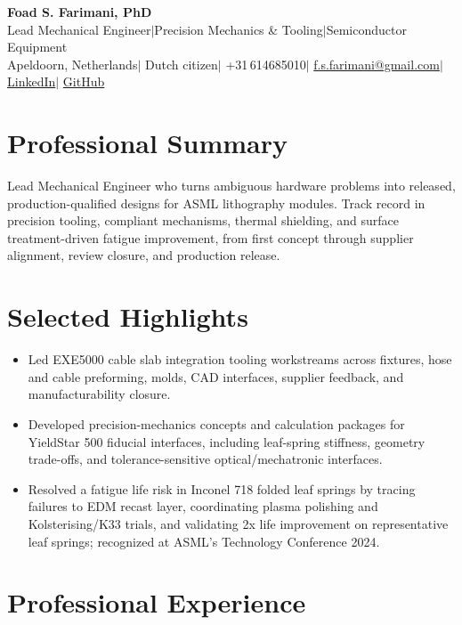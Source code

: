\documentclass[10pt,a4paper]{article}
\begin{document}
\begin{center}
 {\LARGE\bfseries Foad S. Farimani, PhD} \\[3pt]
 {\small Lead Mechanical Engineer\enspace$\mid$\enspace Precision Mechanics \& Tooling\enspace$\mid$\enspace Semiconductor Equipment}
 \\[3pt]
 {\footnotesize
  Apeldoorn, Netherlands\enspace$\mid$\enspace
  Dutch citizen\enspace$\mid$\enspace
  +31\,614685010\enspace$\mid$\enspace
  \href{mailto:f.s.farimani@gmail.com}{f.s.farimani@gmail.com}\enspace$\mid$\enspace
  \href{https://linkedin.com/in/fsfarimani}{LinkedIn}\enspace$\mid$\enspace
  \href{https://github.com/Foadsf}{GitHub}
 }
\end{center}

\section{Professional Summary}
Lead Mechanical Engineer who turns ambiguous hardware problems into released, production-qualified designs for ASML lithography modules. Track record in precision tooling, compliant mechanisms, thermal shielding, and surface treatment-driven fatigue improvement, from first concept through supplier alignment, review closure, and production release.

\section{Selected Highlights}
\begin{itemize}
 \item Led EXE5000 cable slab integration tooling workstreams across fixtures, hose and cable preforming, molds, CAD interfaces, supplier feedback, and manufacturability closure.
 \item Developed precision-mechanics concepts and calculation packages for YieldStar 500 fiducial interfaces, including leaf-spring stiffness, geometry trade-offs, and tolerance-sensitive optical/mechatronic interfaces.
 \item Resolved a fatigue life risk in Inconel 718 folded leaf springs by tracing failures to EDM recast layer, coordinating plasma polishing and Kolsterising/K33 trials, and validating 2x life improvement on representative leaf springs; recognized at ASML's Technology Conference 2024.
\end{itemize}

\section{Professional Experience}
\end{document}
